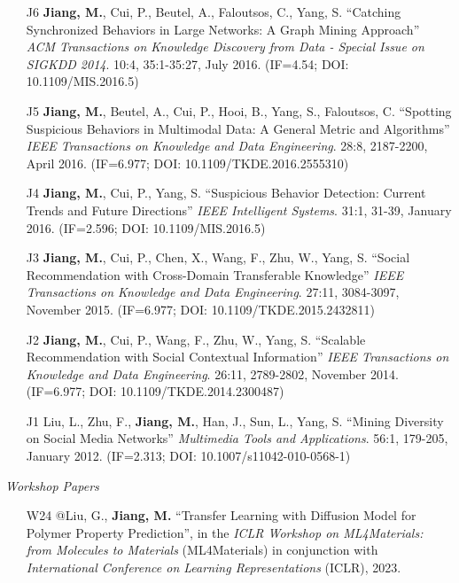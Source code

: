 \documentclass[10pt]{article}
\newenvironment{myindentpar}[1]%
{\begin{list}{}%
         {\setlength{\leftmargin}{#1}}%
         \item[]%
}
{\end{list}}
\newcounter{list}
\begin{document}
\begin{myindentpar}{0.00cm}
\begin{enumerate}[leftmargin=.5cm]
\item[J6] \textbf{Jiang, M.}, Cui, P., Beutel, A., Faloutsos, C., Yang, S. ``Catching Synchronized Behaviors in Large Networks: A Graph Mining Approach'' \textit{ACM Transactions on Knowledge Discovery from Data - Special Issue on SIGKDD 2014}. 10:4, 35:1-35:27, July 2016. (IF=4.54; DOI: 10.1109/MIS.2016.5)

\item[J5] \textbf{Jiang, M.}, Beutel, A., Cui, P., Hooi, B., Yang, S., Faloutsos, C. ``Spotting Suspicious Behaviors in Multimodal Data: A General Metric and Algorithms'' \textit{IEEE Transactions on Knowledge and Data Engineering}. 28:8, 2187-2200, April 2016. (IF=6.977; DOI: 10.1109/TKDE.2016.2555310)

\item[J4] \textbf{Jiang, M.}, Cui, P., Yang, S. ``Suspicious Behavior Detection: Current Trends and Future Directions'' \textit{IEEE Intelligent Systems}. 31:1, 31-39, January 2016. (IF=2.596; DOI: 10.1109/MIS.2016.5)

\item[J3] \textbf{Jiang, M.}, Cui, P., Chen, X., Wang, F., Zhu, W., Yang, S. ``Social Recommendation with Cross-Domain Transferable Knowledge'' \textit{IEEE Transactions on Knowledge and Data Engineering}. 27:11, 3084-3097, November 2015. (IF=6.977; DOI: 10.1109/TKDE.2015.2432811)

\item[J2] \textbf{Jiang, M.}, Cui, P., Wang, F., Zhu, W., Yang, S. ``Scalable Recommendation with Social Contextual Information'' \textit{IEEE Transactions on Knowledge and Data Engineering}. 26:11, 2789-2802, November 2014. (IF=6.977; DOI: 10.1109/TKDE.2014.2300487)

\item[J1] Liu, L., Zhu, F., \textbf{Jiang, M.}, Han, J., Sun, L., Yang, S. ``Mining Diversity on Social Media Networks'' \textit{Multimedia Tools and Applications}. 56:1, 179-205, January 2012. (IF=2.313; DOI: 10.1007/s11042-010-0568-1)

\end{enumerate}

\hspace{-0.25cm}\textit{Workshop Papers}

\begin{enumerate}[leftmargin=.5cm]
		
\item[W24] @Liu, G., \textbf{Jiang, M.} ``Transfer Learning with Diffusion Model for Polymer Property Prediction'', in the \textit{ICLR Workshop on ML4Materials: from Molecules to Materials} (ML4Materials) in conjunction with \textit{International Conference on Learning Representations} (ICLR), 2023.


\end{enumerate}
\end{myindentpar}
\end{document}
